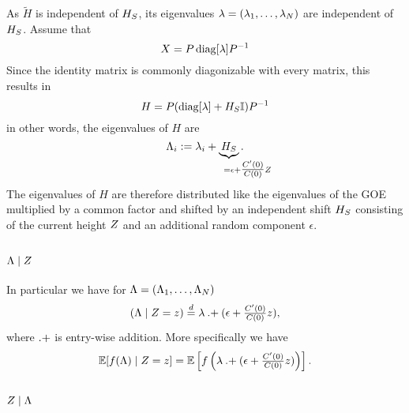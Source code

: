 As \(\tilde{H}\) is independent of \(H_S\), its eigenvalues
\(\lambda=(\lambda_1,\dots,\lambda_N)\) are independent of
\(H_S\). Assume that
\[
	X = P\operatorname{diag}[\lambda]P^{-1}
\]
Since the identity matrix is commonly diagonizable with every matrix, this
results in
\[
	H = P(\operatorname{diag}[\lambda] + H_S\mathbb{I}) P^{-1}
\]
in other words, the eigenvalues of \(H\) are
\[
	\Lambda_i
	:= \lambda_i + \underbrace{\shift}_{=\epsilon \mathrlap{+ \tfrac{\sqC'(0)}{\sqC(0)}\rf}}.
\]
The eigenvalues of \(H\) are therefore distributed like the eigenvalues of the
GOE multiplied by a common factor and shifted by an independent shift \(H_S\)
consisting of the current height \(Z\) and an additional random component
\(\epsilon\).

\subsection{\texorpdfstring{\(\Lambda\mid Z\)}{Λ|Z}}
\label{subsec: Lambda|rf}

In particular we have for \(\Lambda = (\Lambda_1,\dots,\Lambda_N)\)
\[
	(\Lambda \mid Z = z)
	\overset{d}= 
	\lambda \mathbin{.+} (\epsilon + \tfrac{C'(0)}{C(0)}z),
\]
where \(\mathbin{.+}\) is entry-wise addition.
More specifically we have
\begin{equation}\label{eq: expectation f(Lambda) | Z}
		\mathbb{E}[f(\Lambda)\mid Z=z]
		= \mathbb{E}\left[
			f\left(\lambda \mathbin{.+} (\epsilon+\tfrac{C'(0)}{C(0)}z)\right)
		\right].
\end{equation}

\subsection{\texorpdfstring{\(Z\mid\Lambda\)}{Z|Λ}}

